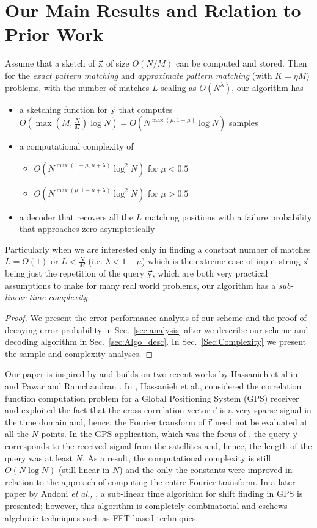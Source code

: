 \section{Our Main Results and Relation to Prior Work}
\label{sec:mainresults}
\begin{theorem}
Assume that a sketch of $\vec{\mathrm{x}}$ of size $O(N/M)$ can be computed and stored. Then for the {\it exact pattern matching} and {\it approximate pattern matching} (with $K = \eta M$) problems, with the number of matches $L$ scaling as $O(N^{\lambda})$, our algorithm has
\begin{itemize}
 \item a sketching function for $\vec{\mathrm{y}}$ that computes $O(\max(M,\frac{N}{M})\log N)=O(N^{\max(\mu,1-\mu)}\log N)$ samples
 \item a computational complexity of 
 \begin{itemize}
 \item  $O(N^{\max(1-\mu,\mu+\lambda)}\log^2 N)$ for $\mu<0.5$
  \item  $O(N^{\max(\mu,1-\mu+\lambda)}\log^2 N)$ for $\mu>0.5$
\end{itemize} 
 \item a decoder that recovers all the $L$ matching positions with a failure probability that approaches zero asymptotically 
 \end{itemize}
Particularly when we are interested only in finding a constant number of matches $L=O(1)$ or $L<\frac{N}{M}$ (i.e. $\lambda<1-\mu$) which is the extreme case of input string $\vec{\mathrm{x}}$ being just the repetition of the query $\vec{\mathrm{y}}$, which are both very practical assumptions to make for many real world problems, our algorithm has a {\it sub-linear time complexity}.
\end{theorem}
\begin{proof}
We present the error performance analysis of our scheme and the proof of decaying error probability in Sec.~\ref{sec:analysis} after we describe our scheme and  decoding algorithm in Sec.~\ref{sec:Algo_desc}. In Sec.~\ref{Sec:Complexity} we present the sample and complexity analyses.
\end{proof}
Our paper is inspired by and builds on two recent works by Hassanieh et al in \cite{hassanieh2012faster} and Pawar and Ramchandran \cite{pawar2014robust}. In \cite{hassanieh2012faster}, Hassanieh et al., considered the correlation function computation problem for a Global Positioning System (GPS) receiver and exploited the fact that the cross-correlation vector $\vec{\mathrm{r}}$ is a very sparse signal in the time domain and, hence, the Fourier transform of $\vec{\mathrm{r}}$ need not be evaluated at all the $N$ points. In the GPS application, which was the focus of \cite{hassanieh2012faster}, the query $\vec{\mathrm{y}}$ corresponds to the received signal from the satellites and, hence, the length of the query was at least $N$. As a result, the computational complexity is still $O(N \log N)$ (still linear in $N$) and the only the constants were improved in relation to the approach of computing the entire Fourier transform. In a later paper by Andoni {\em et al.,} \cite{andoni2013shift}, a sub-linear time algorithm for shift finding in GPS is presented; however, this algorithm is completely combinatorial and eschews algebraic techniques such as FFT-based techniques.

